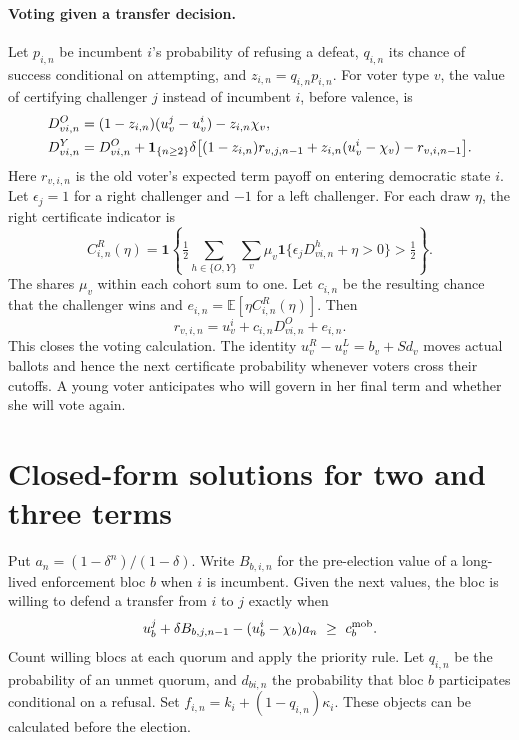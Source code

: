 \documentclass[11pt,letterpaper]{article}
\newcommand{\E}{\mathbb E}\newcommand{\one}{\mathbf 1}\newcommand{\UU}{\mathsf U}
\begin{document}
\paragraph{Voting given a transfer decision.}
Let \(p_{i,n}\) be incumbent \(i\)'s probability of refusing a defeat, \(q_{i,n}\) its chance of success conditional on attempting, and \(z_{i,n}=q_{i,n}p_{i,n}\). For voter type \(v\), the value of certifying challenger \(j\) instead of incumbent \(i\), before valence, is
\begin{align}
 D_{vi,n}^O&=(1-z_{i,n})(u_v^j-u_v^i)-z_{i,n}\chi_v,\notag\\
 D_{vi,n}^Y&=D_{vi,n}^O+\one_{\{n\ge2\}}\delta
 \big[(1-z_{i,n})r_{v,j,n-1}+z_{i,n}(u_v^i-\chi_v)-r_{v,i,n-1}\big].\label{eq:ballots}
\end{align}
Here \(r_{v,i,n}\) is the old voter's expected term payoff on entering democratic state \(i\). Let \(\epsilon_j=1\) for a right challenger and \(-1\) for a left challenger. For each draw \(\eta\), the right certificate indicator is
\[
 C_{i,n}^R(\eta)=\one\!\left\{\tfrac12\sum_{h\in\{O,Y\}}\sum_v \mu_v
                \one\{\epsilon_j D^h_{vi,n}+\eta>0\}>\tfrac12\right\}.
\]
The shares \(\mu_v\) within each cohort sum to one. Let \(c_{i,n}\) be the resulting chance that the challenger wins and \(e_{i,n}=\E[\eta C^R_{i,n}(\eta)]\). Then
\begin{equation}
 r_{v,i,n}=u_v^i+c_{i,n}D_{vi,n}^O+e_{i,n}.\label{eq:old}
\end{equation}
This closes the voting calculation. The identity \(u_v^R-u_v^L=b_v+S d_v\) moves actual ballots and hence the next certificate probability whenever voters cross their cutoffs. A young voter anticipates who will govern in her final term and whether she will vote again.

\newpage
\section{Closed-form solutions for two and three terms}\label{sec:finiteclosed}
Put \(a_n=(1-\delta^n)/(1-\delta)\). Write \(B_{b,i,n}\) for the pre-election value of a long-lived enforcement bloc \(b\) when \(i\) is incumbent. Given the next values, the bloc is willing to defend a transfer from \(i\) to \(j\) exactly when
\[
 u_b^j+\delta B_{b,j,n-1}-(u_b^i-\chi_b)a_n\ \ge\ c_b^{\rm mob}.
\]
Count willing blocs at each quorum and apply the priority rule. Let \(q_{i,n}\) be the probability of an unmet quorum, and \(d_{bi,n}\) the probability that bloc \(b\) participates conditional on a refusal. Set \(f_{i,n}=k_i+(1-q_{i,n})\kappa_i\). These objects can be calculated before the election.
\end{document}
